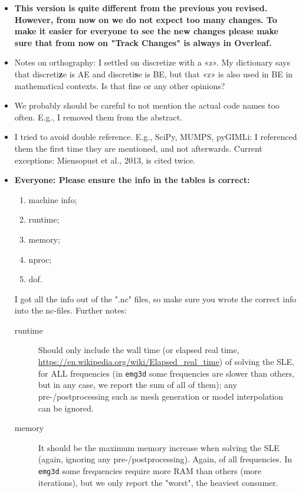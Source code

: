 \documentclass[
    paper,
  ]{geophysics}
\newcommand{\emg}[2]{\texttt{emg#1#2}\xspace}
\newcommand{\itodo}[1]{\todo[inline]{\sffamily #1}}
\begin{document}
\newpage
\itodo{\hfill$\Downarrow$\hfill$\Downarrow$\hfill List of things ToDo, Notes, etc\hfill$\Downarrow$\hfill$\Downarrow$\hfill~}
\begin{itemize}
    \item {\color{red}\bfseries This version is quite different from the previous you revised. However, from now on we do not expect too many changes. To make it easier for everyone to see the new changes please make sure that from now on "Track Changes" is always in Overleaf.}
    \item Notes on orthography: I settled on discretize with a «z». My dictionary says that discreti{\color{red}\bfseries z}e is AE and discreti{\color{red}\bfseries s}e is BE, but that «z» is also used in BE in mathematical contexts. Is that fine or any other opinions?
    \item We probably should be careful to not mention the actual code names too often. E.g., I removed them from the abstract.
    \item I tried to avoid double reference. E.g., SciPy, MUMPS, pyGIMLi: I referenced them the first time they are mentioned, and not afterwards. Current exceptions: Miensopust et al., 2013, is cited twice.
    \item  {\color{red}\bfseries Everyone: Please ensure the info in the tables is correct:}
      \begin{enumerate}
          \item machine info;
          \item runtime;
          \item memory;
          \item nproc;
          \item dof.
      \end{enumerate}
    I got all the info out of the ".nc" files, so make sure you wrote the correct info into the nc-files. Further notes:
      \begin{description}
        \item[runtime] Should only include the wall time (or elapsed real time, \url{https://en.wikipedia.org/wiki/Elapsed_real_time}) of solving the SLE, for ALL frequencies (in \emg3d some frequencies are slower than others, but in any case, we report the sum of all of them); any pre-/postprocessing such as mesh generation or model interpolation can be ignored.
        \item[memory] It should be the maximum memory increase when solving the SLE (again, ignoring any pre-/postprocessing). Again, of all frequencies. In \emg3d some frequencies require more RAM than others (more iterations), but we only report the "worst", the heaviest consumer.

\end{description}
\end{itemize}
\end{document}
